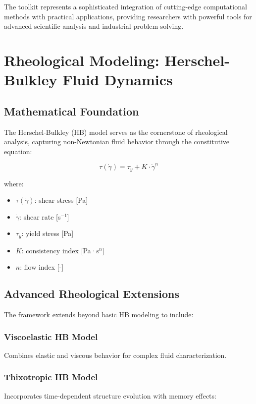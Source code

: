 \documentclass[11pt,a4paper]{article}
\begin{document}
The toolkit represents a sophisticated integration of cutting-edge computational methods with practical applications, providing researchers with powerful tools for advanced scientific analysis and industrial problem-solving.

\section{Rheological Modeling: Herschel-Bulkley Fluid Dynamics}
\label{sec:rheology}

\subsection{Mathematical Foundation}

The Herschel-Bulkley (HB) model serves as the cornerstone of rheological analysis, capturing non-Newtonian fluid behavior through the constitutive equation:

\begin{equation}
\tau(\dot{\gamma}) = \tau_y + K \cdot \dot{\gamma}^n
\label{eq:hb_model}
\end{equation}

where:
\begin{itemize}
    \item $\tau(\dot{\gamma})$: shear stress [Pa]
    \item $\dot{\gamma}$: shear rate [s$^{-1}$]
    \item $\tau_y$: yield stress [Pa]
    \item $K$: consistency index [Pa·s$^n$]
    \item $n$: flow index [-]
\end{itemize}

\subsection{Advanced Rheological Extensions}

The framework extends beyond basic HB modeling to include:

\subsubsection{Viscoelastic HB Model}
Combines elastic and viscous behavior for complex fluid characterization.

\subsubsection{Thixotropic HB Model}
Incorporates time-dependent structure evolution with memory effects:
\end{document}
